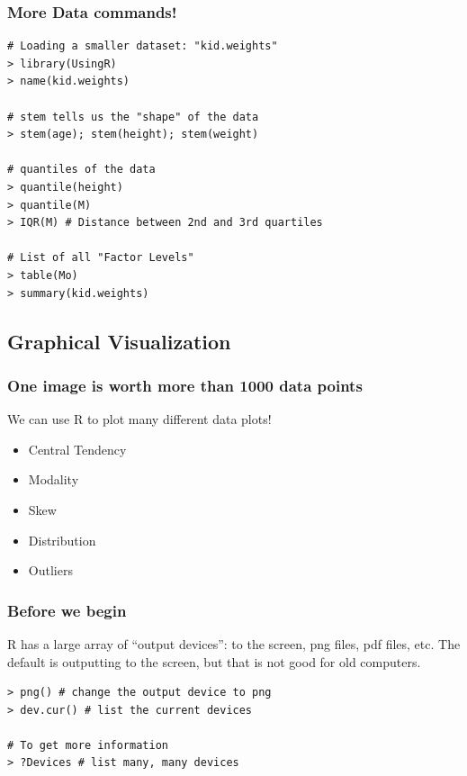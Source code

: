 \documentclass[10pt]{beamer}
\begin{document}
\begin{frame}
  \frametitle{More Data commands!}
  \begin{block}{}
\begin{verbatim}
# Loading a smaller dataset: "kid.weights"
> library(UsingR)
> name(kid.weights)

# stem tells us the "shape" of the data
> stem(age); stem(height); stem(weight)

# quantiles of the data
> quantile(height)
> quantile(M)
> IQR(M) # Distance between 2nd and 3rd quartiles

# List of all "Factor Levels"
> table(Mo)
> summary(kid.weights)
\end{verbatim}
  \end{block}
\end{frame}


\subsection{Graphical Visualization}

\begin{frame}
  \frametitle{One image is worth more than 1000 data points}
  \begin{block}{We can use R to plot many different data plots!}
    \begin{itemize}
    \item Central Tendency
    \item Modality
    \item Skew
    \item Distribution
    \item Outliers
    \end{itemize}
  \end{block}
\end{frame}

\begin{frame}
  \frametitle{Before we begin}
  \begin{block}{}
    R has a large array of ``output devices'': to the screen, png
    files, pdf files, etc. The default is outputting to the screen,
    but that is not good for old computers.
  \end{block}
\bigskip

\begin{verbatim}
> png() # change the output device to png
> dev.cur() # list the current devices

# To get more information
> ?Devices # list many, many devices
\end{verbatim}
\end{frame}
\end{document}

